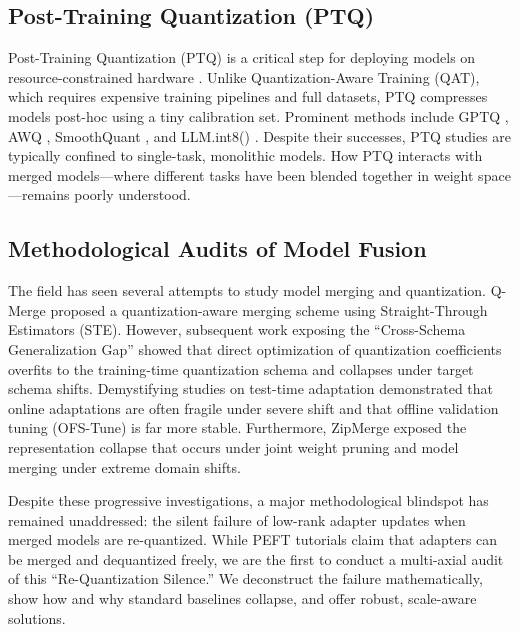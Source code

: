 \subsection{Post-Training Quantization (PTQ)}
Post-Training Quantization (PTQ) is a critical step for deploying models on resource-constrained hardware \cite{Gholami2021Survey,Nagel2021DFQ}. Unlike Quantization-Aware Training (QAT), which requires expensive training pipelines and full datasets, PTQ compresses models post-hoc using a tiny calibration set. Prominent methods include GPTQ \cite{Frantar2022GPTQ}, AWQ \cite{Lin2023AWQ}, SmoothQuant \cite{Xiao2023SmoothQuant}, and LLM.int8() \cite{Dettmers2022LLMint8}. Despite their successes, PTQ studies are typically confined to single-task, monolithic models. How PTQ interacts with merged models—where different tasks have been blended together in weight space—remains poorly understood.

\subsection{Methodological Audits of Model Fusion}
The field has seen several attempts to study model merging and quantization. Q-Merge \cite{MergingSub5} proposed a quantization-aware merging scheme using Straight-Through Estimators (STE). However, subsequent work exposing the ``Cross-Schema Generalization Gap'' \cite{MergingSub6} showed that direct optimization of quantization coefficients overfits to the training-time quantization schema and collapses under target schema shifts. Demystifying studies on test-time adaptation \cite{MergingSub7} demonstrated that online adaptations are often fragile under severe shift and that offline validation tuning (OFS-Tune) is far more stable. Furthermore, ZipMerge \cite{MergingSub8} exposed the representation collapse that occurs under joint weight pruning and model merging under extreme domain shifts. 

Despite these progressive investigations, a major methodological blindspot has remained unaddressed: the silent failure of low-rank adapter updates when merged models are re-quantized. While PEFT tutorials claim that adapters can be merged and dequantized freely, we are the first to conduct a multi-axial audit of this ``Re-Quantization Silence.'' We deconstruct the failure mathematically, show how and why standard baselines collapse, and offer robust, scale-aware solutions.